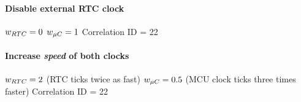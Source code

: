 \paragraph{Disable external RTC clock} $w_{RTC} = 0$ $w_{\mu C} = 1$ Correlation ID = 22

\paragraph{Increase \textit{speed} of both clocks} $w_{RTC} = 2$ (RTC ticks twice as fast) $w_{\mu C} = 0.5$ (MCU clock ticks three times faster) Correlation ID = 22
